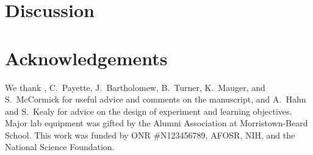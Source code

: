 \documentclass[aps,prl,reprint]{revtex4-1}
\begin{document}
\section{Discussion}

\section{Acknowledgements}
We thank , C.~Payette, J.~Bartholomew, B.~Turner, K.~Mauger, and S.~McCormick for useful advice and comments on the manuscript, and A.~Hahn and S.~Kealy for advice on the design of experiment and learning objectives. Major lab equipment was gifted by the Alumni Association at Morristown-Beard School. This work was funded by ONR \#N123456789, AFOSR, NIH, and the National Science Foundation. 

\end{document}
